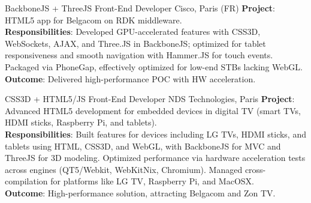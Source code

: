 \documentclass[
  a4paper,
   maincolor=cvblue,
   sectioncolor=cvblue,
]{fortysecondscv}
\begin{document}
\newpage
\makethirdsidebar

\vspace*{-2em} %
\begin{cvtable}
    {BackboneJS + ThreeJS Front-End Developer}
    {Cisco, Paris (FR)}
    {
      \textbf{Project}: HTML5 app for Belgacom on RDK middleware.\\
      \textbf{Responsibilities}: Developed GPU-accelerated features with CSS3D, WebSockets, AJAX, and Three.JS in BackboneJS; optimized for tablet responsiveness and smooth navigation with Hammer.JS for touch events. Packaged via PhoneGap, effectively optimized for low-end STBs lacking WebGL.\\
      \textbf{Outcome}: Delivered high-performance POC with HW acceleration.\\
    }
\end{cvtable}






\begin{cvtable}
    {CSS3D + HTML5/JS Front-End Developer}
    {NDS Technologies, Paris}
    {
      \textbf{Project}: Advanced HTML5 development for embedded devices in digital TV (smart TVs, HDMI sticks, Raspberry Pi, and tablets).\\
      \textbf{Responsibilities}:
          Built features for devices including LG TVs, HDMI sticks, and tablets using HTML, CSS3D, and WebGL, with BackboneJS for MVC and ThreeJS for 3D modeling.
          Optimized performance via hardware acceleration tests across engines (QT5/Webkit, WebKitNix, Chromium). Managed cross-compilation for platforms like LG TV, Raspberry Pi, and MacOSX.\\
      \textbf{Outcome}: High-performance solution, attracting Belgacom and Zon TV.\\
    }
\end{cvtable}
\end{document}
